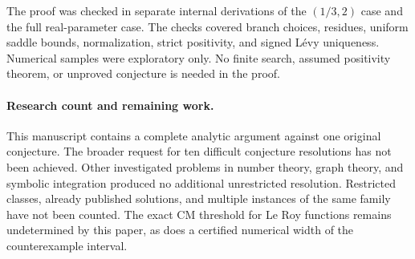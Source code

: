 \documentclass[11pt,a4paper]{article}
\numberwithin{equation}{section}
\theoremstyle{definition}\newtheorem{definition}[theorem]{Definition}
\theoremstyle{remark}\newtheorem{remark}[theorem]{Remark}
\begin{document}
The proof was checked in separate internal derivations of the
\((1/3,2)\) case and the full real-parameter case. The checks covered
branch choices, residues, uniform saddle bounds, normalization,
strict positivity, and signed L\'evy uniqueness. Numerical samples
were exploratory only. No finite search, assumed positivity theorem,
or unproved conjecture is needed in the proof.

\paragraph{Research count and remaining work.}
This manuscript contains a complete analytic argument against one
original conjecture. The broader request for ten difficult conjecture
resolutions has not been achieved. Other investigated problems in
number theory, graph theory, and symbolic integration produced no
additional unrestricted resolution. Restricted classes, already
published solutions, and multiple instances of the same family have
not been counted. The exact CM threshold for Le Roy functions remains
undetermined by this paper, as does a certified numerical width of
the counterexample interval.
\end{document}
